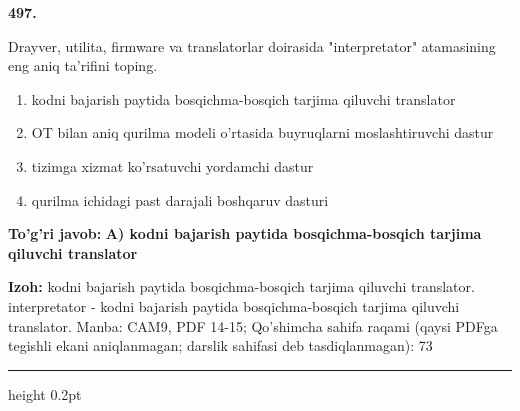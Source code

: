 \documentclass[10pt,a4paper]{article}
\begin{document}
{\bfseries\sffamily\color{ink} 497.}
\par
Drayver, utilita, firmware va translatorlar doirasida "interpretator" atamasining eng aniq ta'rifini toping.
\begin{enumerate}[label=\Alph*),leftmargin=9mm]
\item kodni bajarish paytida bosqichma-bosqich tarjima qiluvchi translator
\item OT bilan aniq qurilma modeli o'rtasida buyruqlarni moslashtiruvchi dastur
\item tizimga xizmat ko'rsatuvchi yordamchi dastur
\item qurilma ichidagi past darajali boshqaruv dasturi
\end{enumerate}
\begin{tcolorbox}[enhanced,breakable,colback=teal!4,colframe=teal!60!black,boxrule=0.45pt,arc=1.2mm,left=2.7mm,right=2.7mm,top=1.8mm,bottom=1.8mm,before skip=2mm,after skip=2mm]
{\bfseries\sffamily\color{teal}To'g'ri javob:} \textbf{A) kodni bajarish paytida bosqichma-bosqich tarjima qiluvchi translator}
\par\smallskip
{\bfseries Izoh:} kodni bajarish paytida bosqichma-bosqich tarjima qiluvchi translator. interpretator - kodni bajarish paytida bosqichma-bosqich tarjima qiluvchi translator. Manba: CAM9, PDF 14-15; Qo'shimcha sahifa raqami (qaysi PDFga tegishli ekani aniqlanmagan; darslik sahifasi deb tasdiqlanmagan): 73
\end{tcolorbox}
\vspace{2mm}\hrule height 0.2pt\vspace{3mm}
\end{document}
